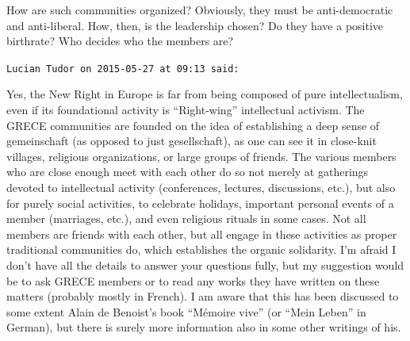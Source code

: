 \begin{footnotesize}
\begin{sffamily}
How are such communities organized? Obviously, they must be anti-democratic and anti-liberal. How, then, is the leadership chosen? Do they have a positive birthrate? Who decides who the members are?

\hfill

\texttt{Lucian Tudor on 2015-05-27 at 09:13 said:}

Yes, the New Right in Europe is far from being composed of pure intellectualism, even if its foundational activity is ``Right-wing'' intellectual activism. The GRECE communities are founded on the idea of establishing a deep sense of gemeinschaft (as opposed to just gesellschaft), as one can see it in close-knit villages, religious organizations, or large groups of friends. The various members who are close enough meet with each other do so not merely at gatherings devoted to intellectual activity (conferences, lectures, discussions, etc.), but also for purely social activities, to celebrate holidays, important personal events of a member (marriages, etc.), and even religious rituals in some cases. Not all members are friends with each other, but all engage in these activities as proper traditional communities do, which establishes the organic solidarity. I'm afraid I don't have all the details to answer your questions fully, but my suggestion would be to ask GRECE members or to read any works they have written on these matters (probably mostly in French). I am aware that this has been discussed to some extent Alain de Benoist's book ``Mémoire vive'' (or ``Mein Leben'' in German), but there is surely more information also in some other writings of his.

\end{sffamily}
\end{footnotesize}

